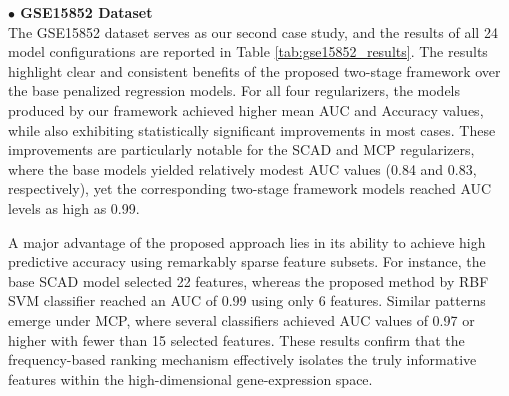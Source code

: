 \documentclass[twoside]{article}
\begin{document}
\vspace{1cm}
\noindent \textbf{$ \bullet $ GSE15852 Dataset}\\
\noindent The GSE15852 dataset serves as our second case study, and the results of all 24 model configurations are reported in Table \ref{tab:gse15852_results}. The results highlight clear and consistent benefits of the proposed two-stage framework over the base penalized regression models. For all four regularizers, the models produced by our framework achieved higher mean AUC and Accuracy values, while also exhibiting statistically significant improvements in most cases. These improvements are particularly notable for the SCAD and MCP regularizers, where the base models yielded relatively modest AUC values (0.84 and 0.83, respectively), yet the corresponding two-stage framework models reached AUC levels as high as 0.99.
	
	A major advantage of the proposed approach lies in its ability to achieve high predictive accuracy using remarkably sparse feature subsets. For instance, the base SCAD model selected 22 features, whereas the proposed method by RBF SVM classifier reached an AUC of 0.99 using only 6 features. Similar patterns emerge under MCP, where several classifiers achieved AUC values of 0.97 or higher with fewer than 15 selected features. These results confirm that the frequency-based ranking mechanism effectively isolates the truly informative features within the high-dimensional gene-expression space.
	
\end{document}
